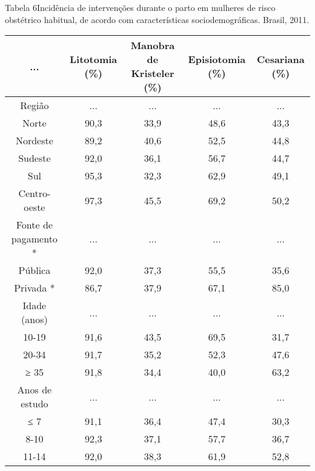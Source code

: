 \documentclass{article}
\begin{document}
Tabela 6Incidência de intervenções durante o parto em mulheres de risco
obstétrico habitual, de acordo com características sociodemográficas.
Brasil, 2011.\begin{table}
\small\centering
\begin{tabulary}{\linewidth}{ C C C C C }
\hline... & Litotomia (\%) & Manobra de Kristeler (\%) & Episiotomia (\%) & Cesariana
(\%)\\ \hline
Região
& ...
& ...
& ...
& ...
\\ \hline

Norte
& 90,3
& 33,9
& 48,6
& 43,3
\\ \hline

Nordeste
& 89,2
& 40,6
& 52,5
& 44,8
\\ \hline

Sudeste
& 92,0
& 36,1
& 56,7
& 44,7
\\ \hline

Sul
& 95,3
& 32,3
& 62,9
& 49,1
\\ \hline

Centro-oeste
& 97,3
& 45,5
& 69,2
& 50,2
\\ \hline

Fonte de pagamento *
& ...
& ...
& ...
& ...
\\ \hline

Pública
& 92,0
& 37,3
& 55,5
& 35,6
\\ \hline

Privada *
& 86,7
& 37,9
& 67,1
& 85,0
\\ \hline

Idade (anos)
& ...
& ...
& ...
& ...
\\ \hline

10-19
& 91,6
& 43,5
& 69,5
& 31,7
\\ \hline

20-34
& 91,7
& 35,2
& 52,3
& 47,6
\\ \hline

≥ 35
& 91,8
& 34,4
& 40,0
& 63,2
\\ \hline

Anos de estudo
& ...
& ...
& ...
& ...
\\ \hline

≤ 7
& 91,1
& 36,4
& 47,4
& 30,3
\\ \hline

8-10
& 92,3
& 37,1
& 57,7
& 36,7
\\ \hline

11-14
& 92,0
& 38,3
& 61,9
& 52,8
\\ \hline


\end{tabulary}
\end{table}
\end{document}

